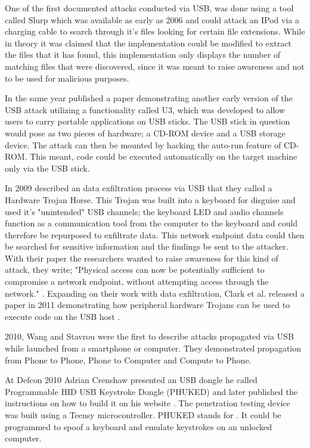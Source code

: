 One of the first documented attacks conducted via USB, was done using a tool called Slurp \cite{SharpIdeasDownloads2006} which was available as early as 2006 and could attack an IPod via a charging cable to search through it's files looking for certain file extensions. While in theory it was claimed that the implementation could be modified to extract the files that it has found, this implementation only displays the number of matching files that were discovered, since it was meant to raise awareness and not to be used for malicious purposes. 

In the same year \cite{al-zarouniRealityRisksConsented2006} published a paper demonstrating another early version of the USB attack utilizing a functionality called U3, which was developed to allow users to carry portable applications on USB sticks. The USB stick in question would pose as two pieces of hardware; a CD-ROM device and a USB storage device. The attack can then be mounted by hacking the auto-run feature of CD-ROM. This meant, code could be executed automatically on the target machine only via the USB stick. 

In 2009 \cite{clarkHardwareTrojanHorse2009} described an data exfiltration process via USB that they called a Hardware Trojan Horse. This Trojan was built into a keyboard for disguise and used it's "unintended" USB channels; the keyboard LED and audio channels function as a communication tool from the computer to the keyboard and could therefore be repurposed to exfiltrate data. This network endpoint data could then be searched for sensitive information and the findings be sent to the attacker. With their paper the researchers wanted to raise awareness for this kind of attack, they write; "Physical access can now be potentially sufficient to compromise a network endpoint, without attempting access through the network." \cite[p.~7]{clarkHardwareTrojanHorse2009}.
Expanding on their work with data exfiltration, Clark et al.\cite{clarkRisksAssociatedUSB2011} released a paper in 2011 demonstrating how peripheral hardware Trojans can be used to execute code on the USB host \cite{clarkRisksAssociatedUSB2011}. 

2010, Wang and Stavrou \cite{wangExploitingSmartphoneUSB2010} were the first to describe attacks propagated via USB while launched from a smartphone or computer. They demonstrated propagation from Phone to Phone, Phone to Computer and Compute to Phone.

At Defcon 2010 Adrian Crenshaw presented an USB dongle he called Programmable HID USB Keystroke Dongle (PHUKED) and later published the instructions on how to build it on his website \cite{ProgrammableHIDUSB}. The penetration testing device was built using a Teensy microcontroller. PHUKED stands for . It could be programmed to spoof a keyboard and emulate keystrokes on an unlocked computer. 

